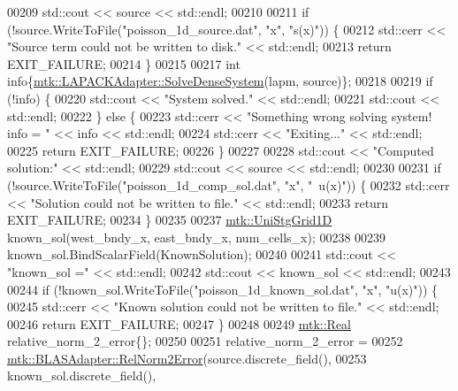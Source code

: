 \begin{DoxyCode}
00209   std::cout << source << std::endl;
00210 
00211   \textcolor{keywordflow}{if} (!source.WriteToFile(\textcolor{stringliteral}{"poisson\_1d\_source.dat"}, \textcolor{stringliteral}{"x"}, \textcolor{stringliteral}{"s(x)"})) \{
00212     std::cerr << \textcolor{stringliteral}{"Source term could not be written to disk."} << std::endl;
00213     \textcolor{keywordflow}{return} EXIT\_FAILURE;
00214   \}
00215 
00217   \textcolor{keywordtype}{int} info\{\hyperlink{classmtk_1_1LAPACKAdapter_a7428bccf74fd4a4af68fb7233846da22}{mtk::LAPACKAdapter::SolveDenseSystem}(lapm, source)\};
00218 
00219   \textcolor{keywordflow}{if} (!info) \{
00220     std::cout << \textcolor{stringliteral}{"System solved."} << std::endl;
00221     std::cout << std::endl;
00222   \} \textcolor{keywordflow}{else} \{
00223     std::cerr << \textcolor{stringliteral}{"Something wrong solving system! info = "} << info << std::endl;
00224     std::cerr << \textcolor{stringliteral}{"Exiting..."} << std::endl;
00225     \textcolor{keywordflow}{return} EXIT\_FAILURE;
00226   \}
00227 
00228   std::cout << \textcolor{stringliteral}{"Computed solution:"} << std::endl;
00229   std::cout << source << std::endl;
00230 
00231   \textcolor{keywordflow}{if} (!source.WriteToFile(\textcolor{stringliteral}{"poisson\_1d\_comp\_sol.dat"}, \textcolor{stringliteral}{"x"}, \textcolor{stringliteral}{"~u(x)"})) \{
00232     std::cerr << \textcolor{stringliteral}{"Solution could not be written to file."} << std::endl;
00233     \textcolor{keywordflow}{return} EXIT\_FAILURE;
00234   \}
00235 
00237   \hyperlink{classmtk_1_1UniStgGrid1D}{mtk::UniStgGrid1D} known\_sol(west\_bndy\_x, east\_bndy\_x, num\_cells\_x);
00238 
00239   known\_sol.BindScalarField(KnownSolution);
00240 
00241   std::cout << \textcolor{stringliteral}{"known\_sol ="} << std::endl;
00242   std::cout << known\_sol << std::endl;
00243 
00244   \textcolor{keywordflow}{if} (!known\_sol.WriteToFile(\textcolor{stringliteral}{"poisson\_1d\_known\_sol.dat"}, \textcolor{stringliteral}{"x"}, \textcolor{stringliteral}{"u(x)"})) \{
00245     std::cerr << \textcolor{stringliteral}{"Known solution could not be written to file."} << std::endl;
00246     \textcolor{keywordflow}{return} EXIT\_FAILURE;
00247   \}
00248 
00249   \hyperlink{group__c01-roots_gac080bbbf5cbb5502c9f00405f894857d}{mtk::Real} relative\_norm\_2\_error\{\};
00250 
00251   relative\_norm\_2\_error =
00252     \hyperlink{classmtk_1_1BLASAdapter_af2ac5691f45e67d6e26186b071119ec4}{mtk::BLASAdapter::RelNorm2Error}(source.discrete\_field(),
00253                                     known\_sol.discrete\_field(),

\end{DoxyCode}
